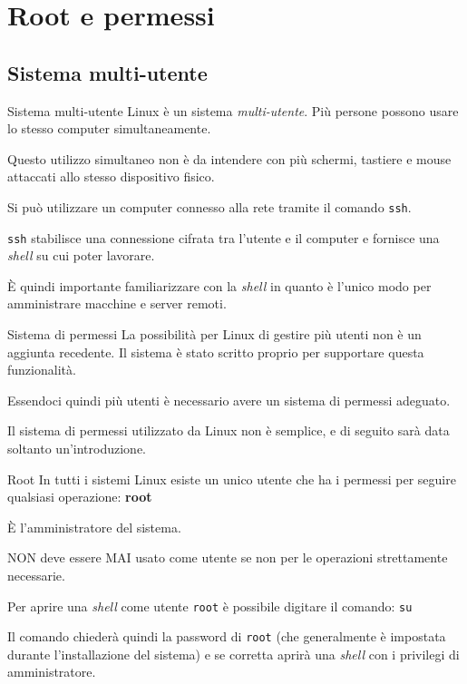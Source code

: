 \documentclass{beamer}
\begin{document}
\section{Root e permessi}

\subsection{Sistema multi-utente}
\begin{frame}{Sistema multi-utente}
  Linux è un sistema \textit{multi-utente}. Più persone possono usare lo stesso
  computer simultaneamente.\bigskip

  Questo utilizzo simultaneo non è da intendere con più schermi, tastiere e mouse
  attaccati allo stesso dispositivo fisico.\bigskip

  Si può utilizzare un computer connesso alla rete tramite il comando 
  \texttt{ssh}.\bigskip

  \texttt{ssh} stabilisce una connessione cifrata tra l'utente e il computer e
  fornisce una \textit{shell} su cui poter lavorare.\bigskip

  È quindi importante familiarizzare con la \textit{shell} in quanto è l'unico
  modo per amministrare macchine e server remoti.
\end{frame}

\begin{frame}{Sistema di permessi}
  La possibilità per Linux di gestire più utenti non è un aggiunta recedente. Il 
  sistema è stato scritto proprio per supportare questa funzionalità.\bigskip

  Essendoci quindi più utenti è necessario avere un sistema di permessi 
  adeguato.\bigskip

  Il sistema di permessi utilizzato da Linux non è semplice, e di seguito sarà
  data soltanto un'introduzione.\bigskip
\end{frame}

\begin{frame}{Root}
  In tutti i sistemi Linux esiste un unico utente che ha i permessi per seguire
  qualsiasi operazione: \textbf{root}\bigskip

  È l'amministratore del sistema.\bigskip

  NON deve essere MAI usato come utente se non per le operazioni strettamente
  necessarie.\bigskip

  Per aprire una \textit{shell} come utente \texttt{root} è possibile digitare
  il comando: \texttt{su}\bigskip

  Il comando chiederà quindi la password di \texttt{root} (che generalmente è
  impostata durante l'installazione del sistema) e se corretta aprirà una 
  \textit{shell} con i privilegi di amministratore.
\end{frame}
\end{document}

